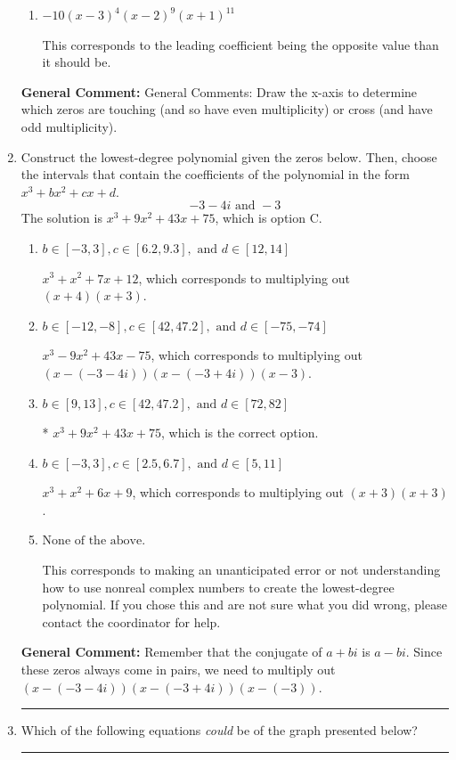\documentclass{extbook}[14pt]
\newcommand{\litem}[1]{\item #1

\rule{\textwidth}{0.4pt}}
\begin{document}
\begin{enumerate}
{\begin{enumerate}[label=\Alph*.]
The factor $3$ should have an even power and the factor $2$ should have an odd power.
\item \( -10(x - 3)^{4} (x - 2)^{9} (x + 1)^{11} \)

This corresponds to the leading coefficient being the opposite value than it should be.
\end{enumerate}

\textbf{General Comment:} General Comments: Draw the x-axis to determine which zeros are touching (and so have even multiplicity) or cross (and have odd multiplicity).
}
\litem{
Construct the lowest-degree polynomial given the zeros below. Then, choose the intervals that contain the coefficients of the polynomial in the form $x^3+bx^2+cx+d$.
\[ -3 - 4 i \text{ and } -3 \]The solution is \( x^{3} +9 x^{2} +43 x + 75 \), which is option C.\begin{enumerate}[label=\Alph*.]
\item \( b \in [-3, 3], c \in [6.2, 9.3], \text{ and } d \in [12, 14] \)

$x^{3} + x^{2} +7 x + 12$, which corresponds to multiplying out $(x + 4)(x + 3)$.
\item \( b \in [-12, -8], c \in [42, 47.2], \text{ and } d \in [-75, -74] \)

$x^{3} -9 x^{2} +43 x -75$, which corresponds to multiplying out $(x-(-3 - 4 i))(x-(-3 + 4 i))(x -3)$.
\item \( b \in [9, 13], c \in [42, 47.2], \text{ and } d \in [72, 82] \)

* $x^{3} +9 x^{2} +43 x + 75$, which is the correct option.
\item \( b \in [-3, 3], c \in [2.5, 6.7], \text{ and } d \in [5, 11] \)

$x^{3} + x^{2} +6 x + 9$, which corresponds to multiplying out $(x + 3)(x + 3)$.
\item \( \text{None of the above.} \)

This corresponds to making an unanticipated error or not understanding how to use nonreal complex numbers to create the lowest-degree polynomial. If you chose this and are not sure what you did wrong, please contact the coordinator for help.
\end{enumerate}

\textbf{General Comment:} Remember that the conjugate of $a+bi$ is $a-bi$. Since these zeros always come in pairs, we need to multiply out $(x-(-3 - 4 i))(x-(-3 + 4 i))(x-(-3))$.
}
\litem{
Which of the following equations \textit{could} be of the graph presented below?

}
\end{enumerate}
\end{document}
